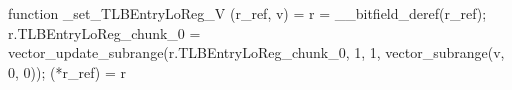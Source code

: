 function _set_TLBEntryLoReg_V (r_ref, v) = {
    r = __bitfield_deref(r_ref);
    r.TLBEntryLoReg_chunk_0 = vector_update_subrange(r.TLBEntryLoReg_chunk_0, 1, 1, vector_subrange(v, 0, 0));
    (*r_ref) = r
}

